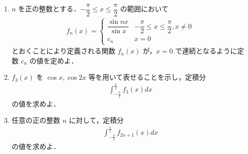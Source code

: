 \documentclass[../../main.tex]{subfiles}
\begin{document}
\begin{enumerate}
  \item $n$ を正の整数とする．$-\dfrac{\pi}{2} \le x \le \dfrac{\pi}{2}$ の範囲において
    \begin{align}
      f_n(x) =
      \begin{cases}
        \dfrac{\sin nx}{\sin x} & -\dfrac{\pi}{2} \le x \le \dfrac{\pi}{2},x \ne 0 \\
        c_n                    & x = 0
      \end{cases}
    \end{align}
    とおくことにより定義される関数 $f_n(x)$ が，$x=0$ で連続となるように定数 $c_n$ の値を定めよ．
  \item $f_3(x)$ を $\cos x, \cos 2x$ 等を用いて表せることを示し，定積分
    \begin{align}
      \int_{-\frac{\pi}{2}}^{\frac{\pi}{2}} f_3(x) dx
    \end{align}
    の値を求めよ．
  \item 任意の正の整数 $n$ に対して，定積分
    \begin{align}
      \int_{-\frac{\pi}{2}}^{\frac{\pi}{2}} f_{2n+1}(x) dx
    \end{align}
    の値を求めよ．
\end{enumerate}
\end{document}
